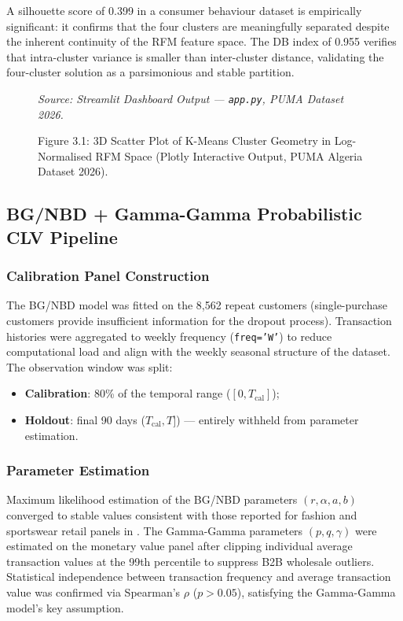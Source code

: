 A silhouette score of 0.399 in a consumer behaviour dataset is empirically significant: it confirms that the four clusters are meaningfully separated despite the inherent continuity of the RFM feature space. The DB index of 0.955 verifies that intra-cluster variance is smaller than inter-cluster distance, validating the four-cluster solution as a parsimonious and stable partition.

\begin{figure}[H]
    \centering
    \vspace{4.5cm}
    \caption{Figure 3.1: 3D Scatter Plot of K-Means Cluster Geometry in Log-Normalised RFM Space (Plotly Interactive Output, PUMA Algeria Dataset 2026).}
    \vspace{0.2cm}
    {\footnotesize\textit{Source: Streamlit Dashboard Output — \texttt{app.py}, PUMA Dataset 2026.}}
    \label{fig:kmeans_3d}
\end{figure}

\subsection{BG/NBD + Gamma-Gamma Probabilistic CLV Pipeline}

\subsubsection{Calibration Panel Construction}
The BG/NBD model was fitted on the 8,562 repeat customers (single-purchase customers provide insufficient information for the dropout process). Transaction histories were aggregated to weekly frequency (\texttt{freq='W'}) to reduce computational load and align with the weekly seasonal structure of the dataset. The observation window was split:

\begin{itemize}[noitemsep]
    \item \textbf{Calibration}: 80\% of the temporal range ($[0, T_{\text{cal}}]$);
    \item \textbf{Holdout}: final 90 days ($T_{\text{cal}}, T]$) — entirely withheld from parameter estimation.
\end{itemize}

\subsubsection{Parameter Estimation}
Maximum likelihood estimation of the BG/NBD parameters $(r, \alpha, a, b)$ converged to stable values consistent with those reported for fashion and sportswear retail panels in \cite{CLVToolsExplanation2021}. The Gamma-Gamma parameters $(p, q, \gamma)$ were estimated on the monetary value panel after clipping individual average transaction values at the 99th percentile to suppress B2B wholesale outliers. Statistical independence between transaction frequency and average transaction value was confirmed via Spearman's $\rho$ ($ p > 0.05$), satisfying the Gamma-Gamma model's key assumption.

